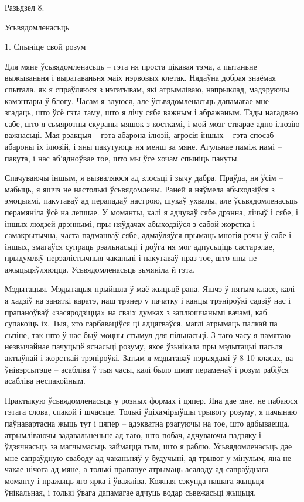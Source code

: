 Разьдзел 8. 

Усьвядомленасьць


1. Спыніце свой розум

Для мяне ўсьвядомленасьць – гэта ня проста цікавая тэма, а пытаньне выжываньня і выратаваньня маіх нэрвовых клетак. Нядаўна добрая знаёмая спытала, як я спраўляюся з нэгатывам, які атрымліваю, напрыклад, мадэруючы камэнтары ў блогу. Часам я злуюся, але ўсьвядомленасьць дапамагае мне згадаць, што ўсё гэта таму, што я лічу сябе важным і абражаным. Тады нагадваю сабе, што я сьмяротны скураны мяшок з косткамі, і мой мозг стварае адно ілюзію важнасьці. Мая рэакцыя – гэта абарона ілюзіі, агрэсія іншых – гэта спосаб абароны іх ілюзій, і яны пакутуюць ня менш за мяне. Агульнае паміж намі – пакута, і нас аб'ядноўвае тое, што мы ўсе хочам спыніць пакуты.

Спачуваючы іншым, я вызваляюся ад злосьці і зычу дабра. Праўда, ня ўсім – мабыць, я яшчэ не настолькі ўсьвядомлены. Раней я няўмела абыходзіўся з эмоцыямі, пакутаваў ад перападаў настрою, шукаў ухвалы, але ўсьвядомленасьць перамяніла ўсё на лепшае. У моманты, калі я адчуваў сябе дрэнна, лічыў і сябе, і іншых людзей дрэннымі, пры няўдачах абыходзіўся з сабой жорстка і самакрытычна, часта падманваў сябе, адмаўляўся прымаць многія рэчы ў сабе і іншых, змагаўся супраць рэальнасьці і доўга ня мог адпусьціць састарэлае, прыдумляў нерэалістычныя чаканьні і пакутаваў праз тое, што яны не ажыцьцяўляюцца. Усьвядомленасьць зьмяніла й гэта.

Мэдытацыя. Мэдытацыя прыйшла ў маё жыцьцё рана. Яшчэ ў пятым класе, калі я хадзіў на заняткі каратэ, наш трэнер у пачатку і канцы трэніроўкі садзіў нас і прапаноўваў «засяродзіцца» на сваіх думках з заплюшчанымі вачамі, каб супакоіць іх. Тыя, хто гарбаваціўся ці адцягваўся, маглі атрымаць палкай па сьпіне, так што ў нас быў моцны стымул для пільнасьці. З таго часу я памятаю незвычайнае пачуцьцё яснасьці розуму, якое ўзьнікала пры мэдытацыі пасьля актыўнай і жорсткай трэніроўкі. Затым я мэдытаваў пэрыядамі ў 8-10 класах, ва ўнівэрсытэце – асабліва ў тыя часы, калі было шмат пераменаў і розум рабіўся асабліва неспакойным.

Практыкую ўсьвядомленасьць у розных формах і цяпер. Яна дае мне, не пабаюся гэтага слова, спакой і шчасьце. Толькі ўціхамірыўшы трывогу розуму, я пачынаю паўнавартасна жыць тут і цяпер – адэкватна рэагуючы на тое, што адбываецца, атрымліваючы задавальненьне ад таго, што побач, адчуваючы падзяку і ўдзячнасьць за магчымасьць займацца тым, што я раблю. Усьвядомленасьць дае мне сапраўдную свабоду ад чаканьняў у будучыні, ад трывог у мінулым, яна не чакае нічога ад мяне, а толькі прапануе атрымаць асалоду ад сапраўднага моманту і пражыць яго ярка і ўважліва. Кожная сэкунда нашага жыцьця ўнікальная, і толькі ўвага дапамагае адчуць водар сьвежасьці жыцьця.

